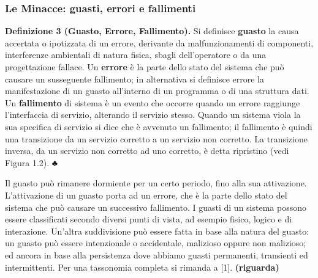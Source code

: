 \documentclass[14pt]{extarticle}
\begin{document}
\subsubsection{Le Minacce: guasti, errori e fallimenti}
\textbf{Definizione 3 (Guasto, Errore, Fallimento).} Si definisce \textbf{guasto} la causa accertata o ipotizzata di un errore, derivante da malfunzionamenti di componenti, interferenze ambientali di natura fisica, sbagli dell’operatore o da una progettazione fallace.
Un \textbf{errore} è la parte dello stato del sistema che può causare un susseguente fallimento; in alternativa si definisce errore la manifestazione di un guasto all’interno di un programma o di una struttura dati. Un \textbf{fallimento} di sistema è un evento che
occorre quando un errore raggiunge l’interfaccia di servizio, alterando il servizio stesso. Quando un sistema viola la sua specifica di servizio si dice che è avvenuto un
fallimento; il fallimento è quindi una transizione da un servizio corretto a un servizio
non corretto. La transizione inversa, da un servizio non corretto ad uno corretto, è
detta ripristino (vedi Figura 1.2).
♣

Il guasto può rimanere dormiente per un certo periodo, fino alla sua attivazione. L’attivazione di un guasto porta ad un errore, che è la parte dello
stato del sistema che può causare un successivo fallimento. I guasti di un
sistema possono essere classificati secondo diversi punti di vista, ad esempio
fisico, logico e di interazione. Un’altra suddivisione può essere fatta in base
alla natura del guasto: un guasto può essere intenzionale o accidentale, malizioso oppure non malizioso; ed ancora in base alla persistenza dove abbiamo
guasti permanenti, transienti ed intermittenti. Per una tassonomia completa
si rimanda a [1]. \textbf{(riguarda)}
\end{document}
